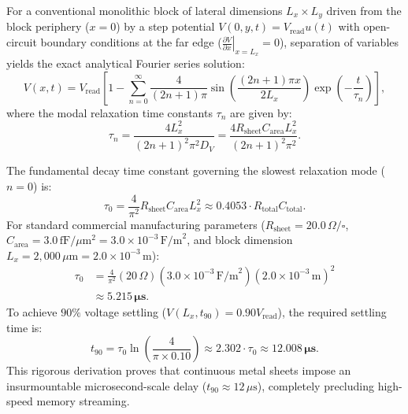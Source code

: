 \documentclass[journal]{IEEEtran}
\begin{document}
For a conventional monolithic block of lateral dimensions $L_x \times L_y$ driven from the block periphery ($x = 0$) by a step potential $V(0, y, t) = V_{\text{read}} u(t)$ with open-circuit boundary conditions at the far edge ($\left.\frac{\partial V}{\partial x}\right|_{x=L_x} = 0$), separation of variables yields the exact analytical Fourier series solution:
\begin{equation}
    V(x, t) = V_{\text{read}} \left[ 1 - \sum_{n=0}^{\infty} \frac{4}{(2n+1)\pi} \sin\left(\frac{(2n+1)\pi x}{2 L_x}\right) \exp\left(-\frac{t}{\tau_n}\right) \right],
\end{equation}
where the modal relaxation time constants $\tau_n$ are given by:
\begin{equation}
    \tau_n = \frac{4 L_x^2}{(2n+1)^2 \pi^2 D_V} = \frac{4 R_{\text{sheet}} C_{\text{area}} L_x^2}{(2n+1)^2 \pi^2}.
\end{equation}

The fundamental decay time constant governing the slowest relaxation mode ($n=0$) is:
\begin{equation}
    \tau_0 = \frac{4}{\pi^2} R_{\text{sheet}} C_{\text{area}} L_x^2 \approx 0.4053 \cdot R_{\text{total}} C_{\text{total}}.
\end{equation}
For standard commercial manufacturing parameters ($R_{\text{sheet}} = 20.0\,\Omega/\square$, $C_{\text{area}} = 3.0\,\text{fF}/\mu\text{m}^2 = 3.0 \times 10^{-3}\,\text{F/m}^2$, and block dimension $L_x = 2,000\,\mu\text{m} = 2.0 \times 10^{-3}\,\text{m}$):
\begin{align}
    \tau_0 &= \frac{4}{\pi^2} (20\,\Omega) (3.0 \times 10^{-3}\,\text{F/m}^2) (2.0 \times 10^{-3}\,\text{m})^2 \nonumber \\
    &\approx \mathbf{5.215\,\mu\text{s}}.
\end{align}
To achieve $90\%$ voltage settling ($V(L_x, t_{90}) = 0.90 V_{\text{read}}$), the required settling time is:
\begin{equation}
    t_{90} = \tau_0 \ln\left(\frac{4}{\pi \times 0.10}\right) \approx 2.302 \cdot \tau_0 \approx \mathbf{12.008\,\mu\text{s}}.
\end{equation}
This rigorous derivation proves that continuous metal sheets impose an insurmountable microsecond-scale delay ($t_{90} \approx 12\,\mu\text{s}$), completely precluding high-speed memory streaming.
\end{document}
